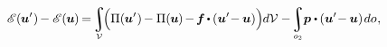 \nopagebreak\vspace{-0.25em}
\begin{equation*}
\potentialenergyfunctional \hspace{.16ex} (\hspace{-0.1ex} \bm{u}' \hspace{.1ex}) \hspace{-0.2ex}
- \potentialenergyfunctional \hspace{.16ex}
(\hspace{-0.1ex} \bm{u} \hspace{-0.1ex}) \hspace{-0.2ex}
= \hspace{-0.3ex}
   \scalebox{.9}{$
      \displaystyle \integral \displaylimits_{\mathcal{V}}
   $}
   \hspace{-0.44ex}
   \Bigl(
      \potentialenergydensity (\hspace{-0.1ex}\bm{u}'\hspace{.1ex}) \hspace{-0.2ex}
      - \potentialenergydensity (\hspace{-0.1ex} \bm{u} \hspace{-0.1ex})
      \hspace{-0.2ex} - \hspace{-0.2ex}
      \bm{f} \hspace{-0.17ex} \dotp \hspace{-0.1ex}
      ( \bm{u}' \hspace{-0.4ex} - \hspace{-0.1ex} \bm{u} )
   \Bigr) \hspace{-0.1ex} d\mathcal{V}
   - \hspace{-0.3ex}
   \scalebox{.9}{$ \displaystyle\integral \displaylimits_{o_2} $} \hspace{-0.1ex}
   \bm{p} \dotp \hspace{-0.1ex}
   ( \bm{u}' \hspace{-0.4ex} - \hspace{-0.1ex} \bm{u} )
   \hspace{.2ex} do
   \hspace{.1ex}
   ,
\vspace{-0.1em}
\end{equation*}

